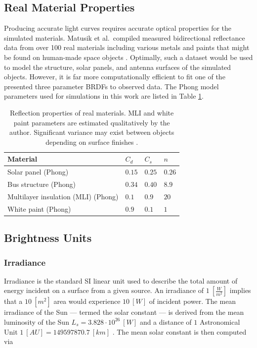\subsection{Real Material Properties}

Producing accurate light curves requires accurate optical properties for the simulated materials. Matusik et al.\ compiled measured bidirectional reflectance data from over 100 real materials including various metals and paints that might be found on human-made space objects \cite{matusik2003}. Optimally, such a dataset would be used to model the structure, solar panels, and antenna surfaces of the simulated objects. However, it is far more computationally efficient to fit one of the presented three parameter BRDFs to observed data. The Phong model parameters used for simulations in this work are listed in Table \ref{tb:real_matprops}.

\begin{table}[]
  \centering
  \begin{tabular}{|l|l|l|l|}
  \hline
  \textbf{Material} & $C_d$ & $C_s$ & $n$ \\ \hline
  Solar panel (Phong) \cite{fankhauser2023}              & $0.15$ & $0.25$ & $0.26$  \\ \hline
  Bus structure (Phong) \cite{fankhauser2023}               & $0.34$ & $0.40$ & $8.9$  \\ \hline
  Multilayer insulation (MLI) (Phong) & $0.1$ & $0.9$ & $20$ \\ \hline
  White paint (Phong) & $0.9$ & $0.1$ & $1$ \\ \hline
  \end{tabular}
  \caption{Reflection properties of real materials. MLI and white paint parameters are estimated qualitatively by the author. Significant variance may exist between objects depending on surface finishes \cite{matusik2003}.}
  \label{tb:real_matprops}
\end{table}

\subsection{Brightness Units} \label{sec:brightness_units}

\subsubsection{Irradiance}

Irradiance is the standard SI linear unit used to describe the total amount of energy incident on a
surface from a given source. An irradiance of $1 \: \left[ \frac{W}{m^2} \right]$ implies that a $10
\: [m^2]$ area would experience $10 \: [W]$ of incident power. The mean irradiance of the Sun --- termed the solar constant --- is derived from the mean luminosity of the Sun $L_s = 3.828\cdot10^{26} \: [W]$ and a distance of $1$ Astronomical Unit $1 \: [AU] = 149597870.7 \: [km]$ \cite{frueh2019notes}. The mean solar constant is then computed via


